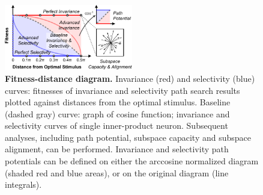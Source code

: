 \begin{figure}
\centering \includegraphics[width=0.5\textwidth]{Figs/fda.pdf} 
\caption{
{\bf Fitness-distance diagram.} Invariance (red) and selectivity (blue) curves: fitnesses of invariance and selectivity path search results plotted against distances from the optimal stimulus. Baseline (dashed gray) curve: graph of cosine function; invariance and selectivity curves of single inner-product neuron. Subsequent analyses, including path potential, subspace capacity and subspace alignment, can be performed. Invariance and selectivity path potentials can be defined on either the arccosine normalized diagram (shaded red and blue areas), or on the original diagram (line integrals).}
\label{fig:fd_diag}
\end{figure}

